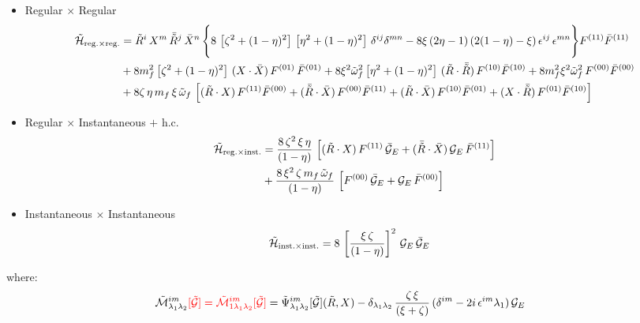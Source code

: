 \documentclass[9pt]{article}
\newif\ifmarked \markedtrue
\newcommand{\chg}[1]{\ifmarked{\color{red}#1}\else{#1}\fi}
\numberwithin{equation}{section}
\begin{document}
\begin{itemize}
    \item Regular $\times$ Regular
    \begin{align}
\mathcal{\Tilde{H}}_{\mathrm{reg.}\times \mathrm{reg.}} & = \Tilde{R}^{i}\, X^{m}\, \Bar{\Tilde{R}}^{j}\,\Bar{X}^{n}\,\Bigg\{8\,\left[\zeta^{2} + (1-\eta)^{2}\right]\,\left[\eta^{2} + (1-\eta)^{2}\right]\,\delta^{ij}\delta^{mn}- 8\xi\, (2\eta -1)\,(2(1-\eta)-\xi)\,\epsilon^{ij}\,\epsilon^{mn}\Bigg\}F^{(11)}\Bar{F}^{(11)}\notag \\ & +8m^{2}_{f}\left[\zeta^{2} + (1-\eta)^{2}\right]\, (X\cdot \Bar{X})\,F^{(01)}\,\Bar{F}^{(01)} + 8\xi^{2}\Tilde{\omega}^{2}_{f}\left[\eta^{2}+(1-\eta)^{2}\right]\,(\Tilde{R}\cdot \Bar{\Tilde{R}})\,F^{(10)}\Bar{F}^{(10)} +8m^{2}_{f}\xi^{2}\Tilde{\omega}^{2}_{f}\,F^{(00)}\Bar{F}^{(00)}\notag \\ & +8\zeta\,\eta\, m_{f}\, \xi\, \Tilde{\omega}_{f}\, \left[(\Tilde{R}\cdot X)\, F^{(11)}\Bar{F}^{(00)} + (\Bar{\Tilde{R}}\cdot \Bar{X})\,F^{(00)}\Bar{F}^{(11)} + (\Tilde{R}\cdot \Bar{X})\,F^{(10)}\Bar{F}^{(01)} + (X\cdot \Bar{\Tilde{R}})\,F^{(01)}\Bar{F}^{(10)}\right]
    \end{align}
    \item Regular $\times$ Instantaneous $+$ h.c.
    \begin{align}
               \mathcal{\Tilde{H}}_{\mathrm{reg.}\times \mathrm{inst.}} & = \frac{8\,\zeta^{2}\,\xi\,\eta}{(1-\eta)}\,\left[(\Tilde{R}\cdot X)\,F^{(11)}\,\Bar{\mathcal{G}}_{E} + (\Bar{\Tilde{R}}\cdot \Bar{X})\,\mathcal{G}_{E}\,\Bar{F}^{(11)}\right]\notag \\ & + \frac{8\,\xi^{2}\,\zeta\,m_{f}\,\Tilde{\omega}_{f}}{(1-\eta)}\, \left[F^{(00)}\,\Bar{\mathcal{G}}_{E} + \mathcal{G}_{E}\,\Bar{F}^{(00)}\right]
    \end{align}
\item Instantaneous $\times$ Instantaneous
    \begin{align}
\mathcal{\Tilde{H}}_{\mathrm{inst.}\times \mathrm{inst.}} & = 8\, \left[\frac{\xi\,\zeta}{(1-\eta)}\right]^{2}\, \mathcal{G}_{E}\,\Bar{\mathcal{G}}_{E}
    \end{align}
\end{itemize}
where:
\begin{align}
\mathcal{\Tilde{M}}^{im}_{\lambda_{1}\lambda_{2}}\chg{[\Tilde{\mathcal{G}}] = \mathcal{\Tilde{M}}^{im}_{1\lambda_{1}\lambda_{2}}[\Tilde{\mathcal{G}}]} &  = \Tilde{\Psi}^{im}_{\lambda_{1}\lambda_{2}}[\mathcal{\Tilde{G}}](\Tilde{R},X) - \delta_{\lambda_{1}\lambda_{2}}\,\frac{\zeta\,\xi}{(\xi + \zeta)}\,(\delta^{im}-2i\,\epsilon^{im}\lambda_{1})\,\mathcal{G}_{E} 
\label{chg:dupM}\end{align}
\end{document}
